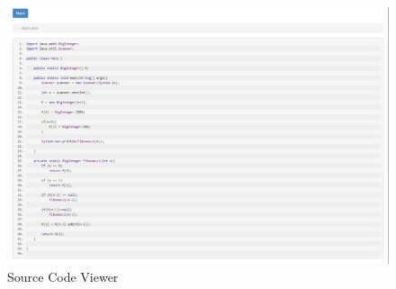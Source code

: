 \begin{figure}[H]
	\centering
	\includegraphics[width=\textwidth]{img/sourceviewer-screen}
	\caption{Source Code Viewer}
\end{figure}

